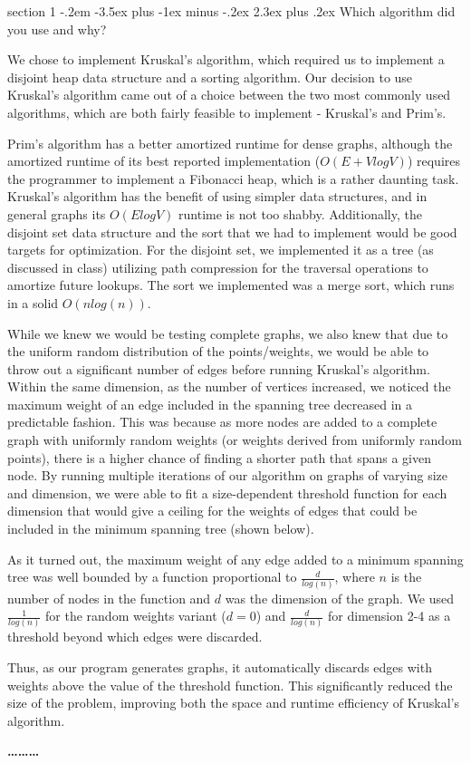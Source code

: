 \documentclass[12pt]{article}
\makeatletter
\newenvironment{problem}{\@startsection
       {section}
       {1}
       {-.2em}
       {-3.5ex plus -1ex minus -.2ex}
       {2.3ex plus .2ex}
       {\pagebreak[3]%
       \large\bf\noindent{Problem }
       }
       }
       {%
       \begin{center}\large\bf \ldots\ldots\ldots\end{center}}
\makeatother
\begin{document}
\begin{problem}{}
Which algorithm did you use and why?

We chose to implement Kruskal's algorithm, which required us to implement a disjoint heap data structure and a sorting algorithm.  Our decision to use Kruskal's algorithm came out of a choice between the two most commonly used algorithms, which are both fairly feasible to implement - Kruskal's and Prim's.

Prim's algorithm has a better amortized runtime for dense graphs, although the amortized runtime of its best reported implementation ($O(E + VlogV)$) requires the programmer to implement a Fibonacci heap, which is a rather daunting task.  Kruskal's algorithm has the benefit of using simpler data structures, and in general graphs its $O(ElogV)$ runtime is not too shabby.  Additionally, the disjoint set data structure and the sort that we had to implement would be good targets for optimization.  For the disjoint set, we implemented it as a tree (as discussed in class) utilizing path compression for the traversal operations to amortize future lookups.  The sort we implemented was a merge sort, which runs in a solid $O(nlog(n))$.

While we knew we would be testing complete graphs, we also knew that due to the uniform random distribution of the points/weights, we would be able to throw out a significant number of edges before running Kruskal's algorithm.  Within the same dimension, as the number of vertices increased, we noticed the maximum weight of an edge included in the spanning tree decreased in a predictable fashion.  This was because as more nodes are added to a complete graph with uniformly random weights (or weights derived from uniformly random points), there is a higher chance of finding a shorter path that spans a given node.  By running multiple iterations of our algorithm on graphs of varying size and dimension, we were able to fit a size-dependent threshold function for each dimension that would give a ceiling for the weights of edges that could be included in the minimum spanning tree (shown below).

As it turned out, the maximum weight of any edge added to a minimum spanning tree was well bounded by a function proportional to $\frac{d}{log(n)}$, where $n$ is the number of nodes in the function and $d$ was the dimension of the graph. We used $\frac{1}{log(n)}$ for the random weights variant ($d=0$) and $\frac{d}{log(n)}$ for dimension 2-4 as a threshold beyond which edges were discarded.

Thus, as our program generates graphs, it automatically discards edges with weights above the value of the threshold function.  This significantly reduced the size of the problem, improving both the space and runtime efficiency of Kruskal's algorithm.

\end{problem}
\end{document}
